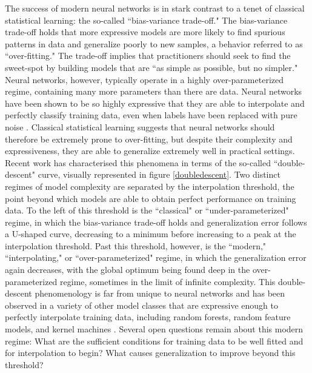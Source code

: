 \documentclass[a4paper, 11pt]{article}
\begin{document}
The success of modern neural networks is in stark contrast to a tenet of classical statistical learning: the so-called ``bias-variance trade-off." The bias-variance trade-off holds that more expressive models are more likely to find spurious patterns in data and generalize poorly to new samples, a behavior referred to as ``over-fitting." The trade-off implies that practitioners should seek to find the sweet-spot by building models that are ``as simple as possible, but no simpler." Neural networks, however, typically operate in a highly over-parameterized regime, containing many more parameters than there are data. Neural networks have been shown to be so highly expressive that they are able to interpolate and perfectly classify training data, even when labels have been replaced with pure noise \cite{zhangUnderstandingDeepLearning2017}. Classical statistical learning suggests that neural networks should therefore be extremely prone to over-fitting, but despite their complexity and expressiveness, they are able to generalize extremely well in practical settings.\\

Recent work \cite{belkinReconcilingModernMachine2019} has characterised this phenomena in terms of the so-called ``double-descent" curve, visually represented in figure \ref{doubledescent}. Two distinct regimes of model complexity are separated by the interpolation threshold, the point beyond which models are able to obtain perfect performance on training data. To the left of this threshold is the ``classical" or ``under-parameterized" regime, in which the bias-variance trade-off holds and generalization error follows a U-shaped curve, decreasing to a minimum before increasing to a peak at the interpolation threshold. Past this threshold, however, is the ``modern," ``interpolating," or ``over-parameterized" regime, in which the generalization error again decreases, with the global optimum being found deep in the over-parameterized regime, sometimes in the limit of infinite complexity. This double-descent phenomenology is far from unique to neural networks and has been observed in a variety of other model classes that are expressive enough to perfectly interpolate training data, including random forests, random feature models, and kernel machines \cite{ belkinReconcilingModernMachine2019, belkinUnderstandDeepLearning2018}. Several open questions remain about this modern regime: What are the sufficient conditions for training data to be well fitted and for interpolation to begin? What causes generalization to improve beyond this threshold?
\end{document}
